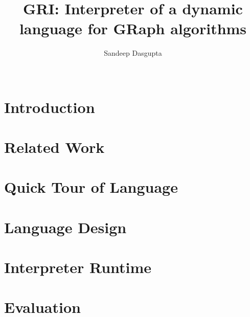 \documentclass{sig-alternate}
\begin{document}
\title{GRI: Interpreter of a dynamic language for GRaph algorithms}

%
\author{
\alignauthor Sandeep Dasgupta\\ \\  } \date{}

\maketitle 




\section{Introduction}



\section{Related Work}\label{sec:bgrel}


\section{Quick Tour of Language}\label{sec:motiv}


\section{Language Design}\label{sec:language}


\section{Interpreter Runtime}\label{sec:runtime}


\section{Evaluation}\label{sec:eval}




  
\end{document}
